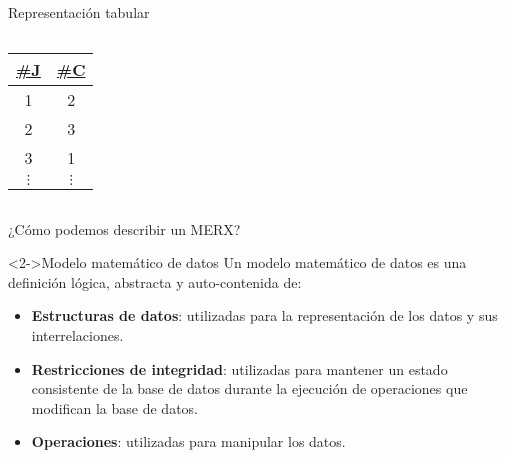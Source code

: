 \begin{frame}{Representaci\'on tabular}
\begin{columns}[T]
\begin{column}{0.48\linewidth}
\begin{center}
                \begin{tiny}
                    \begin{tabular}{|c|c|}
                        \hline
                        \underline{\#J} & \underline{\#C}\\
                        \hline
                        1 & 2  \\
                        \hline
                        2 & 3\\
                        \hline
                        3 & 1\\
                        \hline
                        $\vdots$ & $\vdots$\\
                        \hline
                    \end{tabular}
                \end{tiny}
                
            \end{center}
        \end{column}
        
    \end{columns}

\end{frame}

\begin{frame}{¿C\'omo podemos describir un MERX?}

    \begin{block}<2->{Modelo matem\'atico de datos}
        Un modelo matem\'atico de datos es una definici\'on l\'ogica,
        abstracta y auto-contenida de: \begin{itemize}
            \item<3-> \textbf{Estructuras de datos}: utilizadas para la representaci\'on de los datos
            y sus interrelaciones.
            \item<4-> \textbf{Restricciones de integridad}: utilizadas para mantener un estado consistente
            de la base de datos durante la ejecuci\'on de operaciones que modifican la base de datos.
            \item<5-> \textbf{Operaciones}: utilizadas para manipular los datos.
        \end{itemize}
    \end{block}
    
\end{frame}



